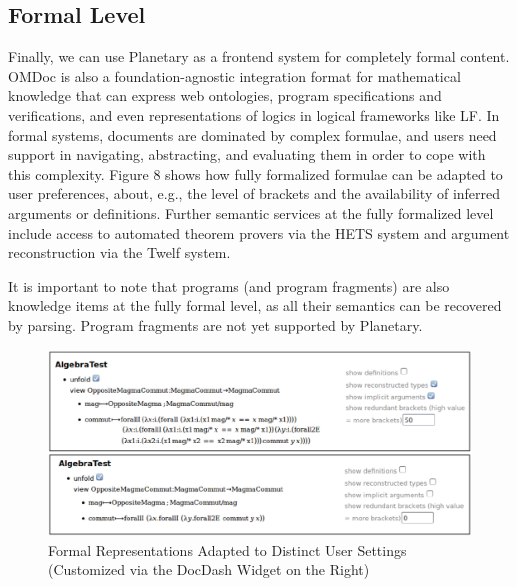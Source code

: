 \subsection{Formal Level}

Finally, we can use Planetary as a frontend system for completely formal content. OMDoc is
also a foundation-agnostic integration format for mathematical knowledge that can express
web ontologies, program specifications and verifications, and even representations of
logics in logical frameworks like LF. In formal systems, documents are dominated by
complex formulae, and users need support in navigating, abstracting, and evaluating them
in order to cope with this complexity. Figure 8 shows how fully formalized formulae can be
adapted to user preferences, about, e.g., the level of brackets and the availability of
inferred arguments or definitions. Further semantic services at the fully formalized level
include access to automated theorem provers via the HETS system and argument
reconstruction via the Twelf system.

It is important to note that programs (and program fragments) are also knowledge items at
the fully formal level, as all their semantics can be recovered by parsing. Program
fragments are not yet supported by Planetary.

\begin{figure}[ht]\centering
  \includegraphics[width=\textwidth]{FormalRepresentationAdapted}
  \caption{Formal Representations Adapted to Distinct User Settings (Customized via the
    DocDash Widget on the Right)}
\end{figure} 

